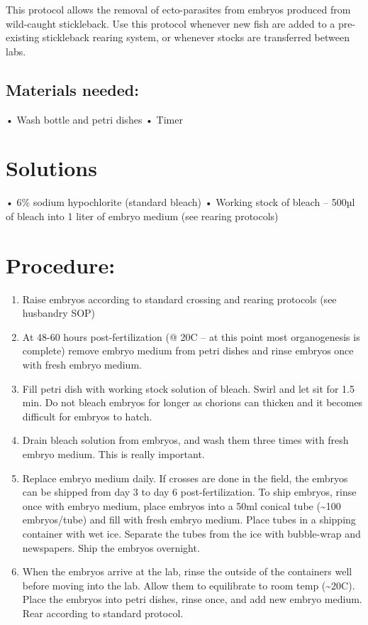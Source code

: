 \documentclass[
]{book}
\begin{document}
This protocol allows the removal of ecto-parasites from embryos produced from wild-caught stickleback. Use this protocol whenever new fish are added to a pre-existing stickleback rearing system, or whenever stocks are transferred between labs.

\hypertarget{materials-needed}{%
\subsection{Materials needed:}\label{materials-needed}}

• Wash bottle and petri dishes
• Timer

\hypertarget{solutions}{%
\section{Solutions}\label{solutions}}

• 6\% sodium hypochlorite (standard bleach)
• Working stock of bleach -- 500µl of bleach into 1 liter of embryo medium (see rearing protocols)

\hypertarget{procedure}{%
\section{Procedure:}\label{procedure}}

\begin{enumerate}
\def\labelenumi{\arabic{enumi}.}
\item
  Raise embryos according to standard crossing and rearing protocols (see husbandry SOP)
\item
  At 48-60 hours post-fertilization (@ 20C -- at this point most organogenesis is complete) remove embryo medium from petri dishes and rinse embryos once with fresh embryo medium.
\item
  Fill petri dish with working stock solution of bleach. Swirl and let sit for 1.5 min. Do not bleach embryos for longer as chorions can thicken and it becomes difficult for embryos to hatch.
\item
  Drain bleach solution from embryos, and wash them three times with fresh embryo medium. This is really important.
\item
  Replace embryo medium daily. If crosses are done in the field, the embryos can be shipped from day 3 to day 6 post-fertilization. To ship embryos, rinse once with embryo medium, place embryos into a 50ml conical tube (\textasciitilde100 embryos/tube) and fill with fresh embryo medium. Place tubes in a shipping container with wet ice. Separate the tubes from the ice with bubble-wrap and newspapers. Ship the embryos overnight.
\item
  When the embryos arrive at the lab, rinse the outside of the containers well before moving into the lab. Allow them to equilibrate to room temp (\textasciitilde20C). Place the embryos into petri dishes, rinse once, and add new embryo medium. Rear according to standard protocol.
\end{enumerate}
\end{document}

